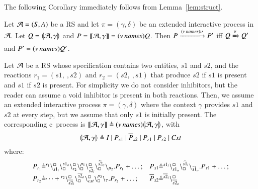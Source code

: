 The following Corollary immediately follows from Lemma~\ref{lem:struct}.

\begin{corollary}
Let ${\cal A} = (S, A)$ be a RS and let $\pi=(\gamma,\delta)$ be an extended  interactive process in ${\cal A}$. 
Let $Q=\llparenthesis{\cal A},\gamma\rrparenthesis$ and $P= \llbracket{\cal A},\gamma\rrbracket = (\nu\, \mathit{names})Q$. 
Then $P \xrightarrow{(\nu\, \mathit{names})\upsilon} P'$ iff $Q \xRightarrow{\upsilon} Q'$ and $P'=(\nu\, \mathit{names})Q'$.
\end{corollary}


\begin{example}\label{ex:backbone}
 Let ${\cal A}$ be a RS whose specification contains two entities, $s1$ and $s2$, and the reactions $r_1=(s1,\ , s2)$ and $r_2 = (s2, \ , s1)$ that produce $s2$ if $s1$ is present and $s1$ if $s2$ is present. For simplicity we do not consider inhibitors, but the reader can assume a void inhibitor is present in both reactions. Then, we assume an  extended interactive process $\pi=(\gamma,\delta)$ where the context $\gamma$ provides  $s1$ and $s2$ at every step, but we assume that only $s1$ is initially present. The corresponding c\CNA \ process is $\llbracket{\cal A},\gamma\rrbracket \triangleq (\nu\, \mathit{names}) \llparenthesis{\cal A},\gamma\rrparenthesis$, with 
$$
\llparenthesis{\cal A},\gamma\rrparenthesis \triangleq 
I ~|~ P_{s1}~|~\overline{P}_{s2}~|~ P_{r1}~|~P_{r2}~|~\mathit{Cxt}
$$
 where:
 \[
 \begin{array}{l@{\hspace{-0.009cm}}c@{\hspace{-0.009cm}}ll@{\hspace{-0.009cm}}c@{\hspace{-0.009cm}}l}
 P_{r_1} &\defeq& \startchain{r_1}\chainedlink{s1_i}{\noact}\chainedlink{\noact}{s1_o}\chainedlink{r_2}{\noact} \chainedlink{\noact}{p_1}\chainedlink{\widetilde{s2}_i}{\noact}\chainedlink{\noact}{\widetilde{s2}_o}\chainend{p_2}.P_{r_1} + \dots; & 
   P_{s1} &\defeq& \startchain{s1_i}\chainedlink{s1_o}{\noact}\chainedlink{\noact}{\widehat{s1}_i}\chainend{\widehat{s1}_o}
 .P_{s1} + \dots; \\   
  P_{r_2} &\defeq& \dots + \startchain{r_2}\chainedlink{\overline{s2}_i}{\noact}\chainedlink{\noact}{\overline{s2}_o}\chainedlink{\mathit{cxt}}{\noact} \chainedlink{\noact}{p_2}\chainend{\silent}.P_{r_2} + \dots; &
  \overline{P}_{s2} &\defeq& \startchain{\overline{s2}_i}\chainedlink{\overline{s2}_o}{\noact}

\end{array}\]
\end{example}
